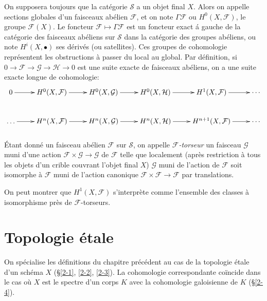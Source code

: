 \documentclass{article}
\newcommand{\cF}{\mathcal{F}}
\newcommand{\cG}{\mathcal{G}}
\newcommand{\cH}{\mathcal{H}}
\newcommand{\cS}{\mathcal{S}}
\begin{document}
On supposera toujours que la catégorie $\cS$ a un objet final $X$. Alors on 
appelle sections globales d'un faisceaux abélien $\cF$, et on note 
$\Gamma\cF$ ou $H^0(X,\cF)$, le groupe $\cF(X)$. Le foncteur 
$\cF\mapsto\Gamma\cF$ est un foncteur exact \'a gauche de la catégorie des 
faisceaux abéliens sur $\cS$ dans la catégorie des groupes abéliens, ou 
note $H^i(X,\bullet)$ ses dérivés (ou satellites). Ces groupes de 
cohomologie représentent les obstructions à passer du local au global. Par 
définition, si $0\to\cF\to\cG\to\cH\to 0$ est une suite exacte de faisceaux 
abéliens, on a une suite exacte longue de cohomologie:
\[\xymatrix{
  0 \ar[r] 
    & H^0(X,\cF) \ar[r] 
    & H^0(X,\cG) \ar[r] 
    & H^0(X,\cH) \ar[r] 
    & H^1(X,\cF) \ar[r] 
    & \cdots \\
  \ldots \ar[r] 
    & H^n(X,\cF) \ar[r] 
    & H^n(X,\cG) \ar[r]
    & H^n(X,\cH) \ar[r] 
    & H^{n+1}(X,\cF) \ar[r] 
    & \cdots
}\]





\subsubsection{}\label{1-6-6}

Étant donné un faisceau abélien $\cF$ sur $\cS$, on appelle 
\emph{$\cF$-torseur} un faisceau $\cG$ muni d'une action $\cF\times\cG\to\cG$ 
de $\cF$ telle que localement (après restriction à tous les objets d'un 
crible couvrant l'objet final $X$) $\cG$ muni de l'action de $\cF$ soit 
isomorphe à $\cF$ muni de l'action canonique $\cF\times \cF\to \cF$ par 
translations. 

On peut montrer que $H^1(X,\cF)$ s'interprète comme l'ensemble des classes 
à isomorphisme près de $\cF$-torseurs. 




















\section{Topologie étale}\label{2}

On spécialise les définitions du chapitre précédent au cas de la 
topologie étale d'un schéma $X$ (\S \ref{2-1}, \ref{2-2}, \ref{2-3}). La 
cohomologie correspondante coïncide dans le cas où $X$ est le spectre d'un 
corps $K$ avec la cohomologie galoisienne de $K$ (\S\ref{2-4}). 
\end{document}
